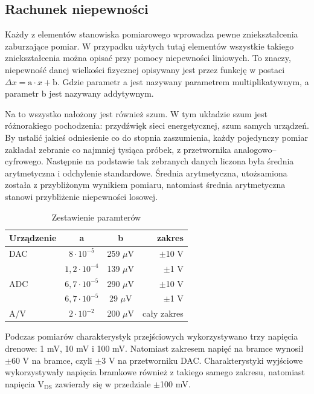 	\subsection{Rachunek niepewności}
	Każdy z elementów stanowiska pomiarowego wprowadza pewne zniekształcenia zaburzające pomiar. W przypadku użytych
	tutaj elementów wszystkie takiego zniekształcenia można opisać przy pomocy niepewności liniowych. To znaczy, 
	niepewność danej wielkości fizycznej opisywany jest przez funkcję w postaci
	 $\Delta x = \mathrm{a}\cdot x + \mathrm{b}$. Gdzie parametr a jest nazywany parametrem multiplikatywnym, 
	a parametr b jest nazywany addytywnym. 

	Na to wszystko nałożony jest również szum. W tym układzie szum jest różnorakiego pochodzenia: przydźwięk sieci
	energetycznej, szum samych urządzeń. By ustalić jakieś odniesienie co do stopnia zaszumienia, każdy pojedynczy 
	pomiar zakładał zebranie co najmniej tysiąca próbek, z przetwornika analogowo--cyfrowego. Następnie na podstawie
	tak zebranych danych liczona była średnia arytmetyczna i odchylenie standardowe. Średnia arytmetyczna, utożsamiona
	została z przybliżonym wynikiem pomiaru, natomiast średnia arytmetyczna stanowi przybliżenie niepewności losowej.
	
	\begin{table}[ht]
	\centering
	\begin{tabular}{l||c|c|r}
		Urządzenie & a & b & zakres \\
		\hline
		\hline
		DAC & $8\cdot 10^{-5}$ & 259 $\mu$V  & $\pm$10 V\\
			& $1,2\cdot 10^{-4}$ &	139 $\mu$V & $\pm$1 V\\
		\hline
		ADC & $6,7\cdot 10^{-5}$ & 290 $\mu$V & $\pm$10 V\\
		    & $6,7\cdot 10^{-5}$ &29 $\mu$V & $\pm$1 V\\
		\hline 
		A/V & $2\cdot 10^{-2}$ & 200 $\mu$V & cały zakres\\
	\end{tabular}
	\caption{ Zestawienie paramterów }
	\label{tab:blendy}
	\end{table}
	
	Podczas pomiarów charakterystyk przejściowych wykorzystywano trzy napięcia drenowe: 1 mV, 10 mV i 100 mV. 
	Natomiast zakresem napięć na bramce wynosił $\pm$60 V na bramce, czyli $\pm$3 V na przetworniku DAC.
	Charakterystyki wyjściowe wykorzystywały napięcia bramkowe również z takiego samego zakresu, natomiast 
	napięcia $\mathrm{V_{DS}}$ zawierały się w przedziale $\pm$100 mV.

